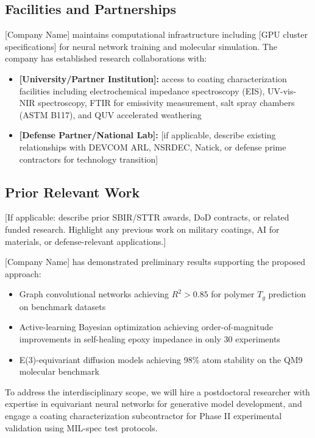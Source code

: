 \documentclass[11pt,letterpaper]{article}
\begin{document}
\subsection{Facilities and Partnerships}

[Company Name] maintains computational infrastructure including [GPU cluster specifications] for neural network training and molecular simulation. The company has established research collaborations with:

\begin{itemize}[nosep]
  \item \textbf{[University/Partner Institution]:} access to coating characterization facilities including electrochemical impedance spectroscopy (EIS), UV-vis-NIR spectroscopy, FTIR for emissivity measurement, salt spray chambers (ASTM B117), and QUV accelerated weathering
  \item \textbf{[Defense Partner/National Lab]:} [if applicable, describe existing relationships with DEVCOM ARL, NSRDEC, Natick, or defense prime contractors for technology transition]
\end{itemize}

\subsection{Prior Relevant Work}

[If applicable: describe prior SBIR/STTR awards, DoD contracts, or related funded research. Highlight any previous work on military coatings, AI for materials, or defense-relevant applications.]

[Company Name] has demonstrated preliminary results supporting the proposed approach:

\begin{itemize}[nosep]
  \item Graph convolutional networks achieving $R^2 > 0.85$ for polymer $T_g$ prediction on benchmark datasets
  \item Active-learning Bayesian optimization achieving order-of-magnitude improvements in self-healing epoxy impedance in only 30 experiments
  \item E(3)-equivariant diffusion models achieving 98\% atom stability on the QM9 molecular benchmark
\end{itemize}

To address the interdisciplinary scope, we will hire a postdoctoral researcher with expertise in equivariant neural networks for generative model development, and engage a coating characterization subcontractor for Phase II experimental validation using MIL-spec test protocols.
\end{document}
